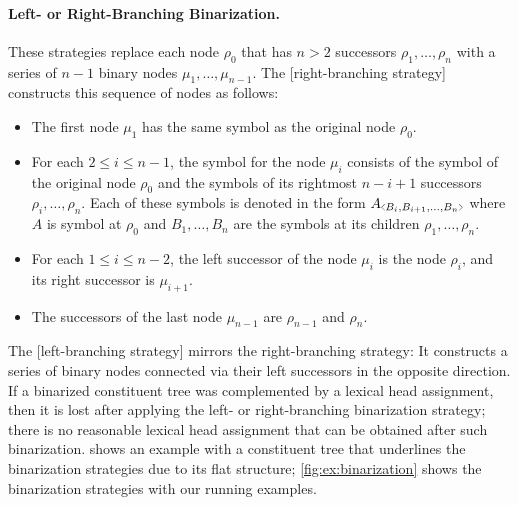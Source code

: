 \documentclass[../../document.tex]{subfiles}
\begin{document}
    \paragraph{Left- or Right-Branching Binarization.}
    These strategies replace each node \(\rho_0\) that has \( n>2 \) successors \(\rho_1, \ldots, \rho_n\) with a series of \( n-1 \) binary nodes \(\mu_1, \ldots, \mu_{n-1}\).
    The [right-branching strategy]  constructs this sequence of nodes as follows:
    \begin{itemize}
        \item The first node \(\mu_1\) has the same symbol as the original node \(\rho_0\).
        \item For each \(2 \leq i \leq n-1\), the symbol for the node \(\mu_i\) consists of the symbol of the original node \(\rho_0\) and the symbols of its rightmost \(n-i+1\) successors \(\rho_{i}, \ldots, \rho_n\). Each of these symbols is denoted in the form \(A\binsym{B_i,B_{i+1},\ldots,B_n}\) where \(A\) is symbol at \(\rho_0\) and \(B_1, \ldots, B_n\) are the symbols at its children \(\rho_1, \ldots, \rho_n\).
        \item For each \(1 \leq i \leq n-2\), the left successor of the node \(\mu_i\) is the node \(\rho_i\), and its right successor is \(\mu_{i+1}\).
        \item The successors of the last node \(\mu_{n-1}\) are \(\rho_{n-1}\) and \(\rho_{n}\).
    \end{itemize}
    The [left-branching strategy]  mirrors the right-branching strategy: It constructs a series of binary nodes connected via their left successors in the opposite direction.
    If a binarized constituent tree was complemented by a lexical head assignment, then it is lost after applying the left- or right-branching binarization strategy; there is no reasonable lexical head assignment that can be obtained after such binarization.
     shows an example with a constituent tree that underlines the binarization strategies due to its flat structure; \cref{fig:ex:binarization} shows the binarization strategies with our running examples.
\end{document}
